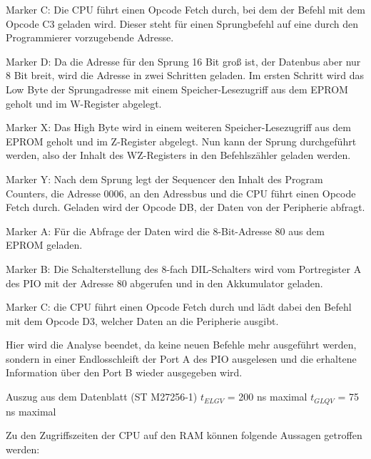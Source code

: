 Marker C: Die CPU führt einen Opcode Fetch durch, bei dem der Befehl mit dem Opcode C3 geladen wird. Dieser steht für einen Sprungbefehl auf eine durch den Programmierer vorzugebende Adresse.

Marker D: Da die Adresse für den Sprung 16 Bit groß ist, der Datenbus aber nur 8 Bit breit, wird die Adresse in zwei Schritten geladen. Im ersten Schritt wird das Low Byte der Sprungadresse mit einem Speicher-Lesezugriff aus dem EPROM geholt und im W-Register abgelegt.

Marker X: Das High Byte wird in einem weiteren Speicher-Lesezugriff aus dem EPROM geholt und im Z-Register abgelegt. Nun kann der Sprung durchgeführt werden, also der Inhalt des WZ-Registers in den Befehlszähler geladen werden.

Marker Y: Nach dem Sprung legt der Sequencer den Inhalt des Program Counters, die Adresse 0006, an den Adressbus und die CPU führt einen Opcode Fetch durch. Geladen wird der Opcode DB, der Daten von der Peripherie abfragt.

Marker A: Für die Abfrage der Daten wird die 8-Bit-Adresse 80 aus dem EPROM geladen.

Marker B: Die Schalterstellung des 8-fach DIL-Schalters wird vom Portregister A des PIO mit der Adresse 80 abgerufen und in den Akkumulator geladen.

Marker C: die CPU führt einen Opcode Fetch durch und lädt dabei den Befehl mit dem Opcode D3, welcher Daten an die Peripherie ausgibt.

Hier wird die Analyse beendet, da keine neuen Befehle mehr ausgeführt werden, sondern in einer Endlosschleift der Port A des PIO ausgelesen und die erhaltene Information über den Port B wieder ausgegeben wird.

Auszug aus dem Datenblatt (ST M27256-1)
$t_{ELGV}$ = 200 ns maximal
$t_{GLQV}$ = 75 ns maximal

Zu den Zugriffszeiten der CPU auf den RAM können folgende Aussagen getroffen werden:

